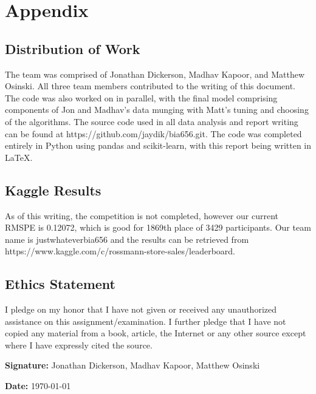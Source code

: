 \documentclass[DIV=calc, paper=a4, fontsize=11pt]{scrartcl}	 %
\begin{document}
\newpage

\section*{Appendix}

\subsection*{Distribution of Work}
The team was comprised of Jonathan Dickerson, Madhav Kapoor, and Matthew Osinski. All three team members contributed to the writing of this document. The code was also worked on in parallel, with the final model comprising components of Jon and Madhav's data munging with Matt's tuning and choosing of the algorithms. The source code used in all data analysis and report writing can be found at https://github.com/jaydik/bia656.git. The code was completed entirely in Python using pandas and scikit-learn, with this report being written in \LaTeX. 

\subsection*{Kaggle Results}
As of this writing, the competition is not completed, however our current RMSPE is 0.12072, which is good for 1869th place of 3429 participants. Our team name is justwhateverbia656 and the results can be retrieved from https://www.kaggle.com/c/rossmann-store-sales/leaderboard. 

\subsection*{Ethics Statement}

I pledge on my honor that I have not given or received any unauthorized 
assistance on this assignment/examination. I further pledge that I have not copied 
any material from a book, article, the Internet or any other source except where I 
have expressly cited the source.

\textbf{Signature:} Jonathan Dickerson, Madhav Kapoor, Matthew Osinski

\textbf{Date:} \today
\end{document}
